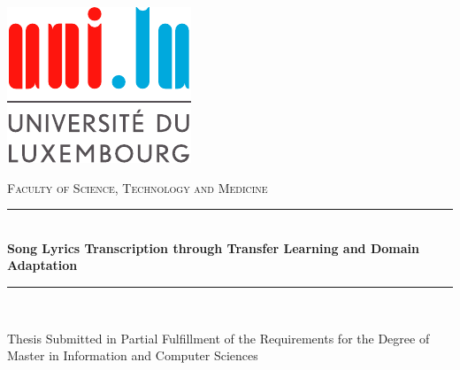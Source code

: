 \newcommand{\HRule}{\rule{\linewidth}{0.5mm}}

\begin{titlepage}

\begin{center}

\includegraphics{00-frontmatter/unilogo.pdf}

\vspace{1cm}

\textsc{\Large Faculty of Science, Technology and Medicine}\\[1.0cm]

\vspace{1cm}

\HRule \\[0.4cm]
{\huge \bfseries Song Lyrics Transcription through Transfer Learning and Domain Adaptation}\\
\HRule \\[1.5cm]


\begin{minipage}{0.8\textwidth}
\begin{center}
{\large Thesis Submitted in Partial Fulfillment of the Requirements
for the Degree of Master in Information and Computer Sciences}
\end{center}
\end{minipage}


\end{center}
\end{titlepage}
